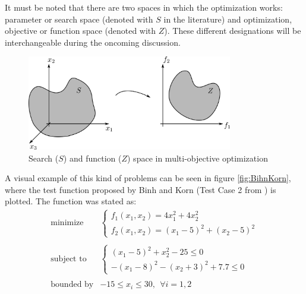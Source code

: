     \newpage
    
    It must be noted that there are two spaces in which the optimization works: parameter or search space (denoted with $S$ in the literature) and optimization, objective or function space (denoted with $Z$). These different designations will be interchangeable during the oncoming discussion. 
    
    \begin{figure}[h!]
        \centering
        \includegraphics[width=0.8\textwidth]{Figures/2/searchSpaceFunction.png}
        \caption{Search ($S$) and function ($Z$) space in multi-objective optimization}
        \label{fig:twoSpaces}
    \end{figure}    
    
    A visual example of this kind of problems can be seen in figure \ref{fig:BihnKorn}, where the test function proposed by Binh and Korn (Test Case 2 from \cite{binh1997mobes}) is plotted. The function was stated as:
    \begin{equation}
        \begin{array}{cl}
            \textrm{minimize} & 
            \left\{ \begin{array}{l}
                f_1(x_1,x_2) = 4x_1^2 + 4x_2^2\\
                f_2(x_1,x_2) = (x_1-5)^2+(x_2-5)^2
            \end{array} \right. \\
            & \\
            \textrm{subject to} &  
            \left\{ \begin{array}{l}
                (x_1-5)^2+x_2^2-25 \leq 0\\
                -(x_1-8)^2-(x_2+3)^2 + 7.7 \leq 0
            \end{array} \right. \\
            & \\
            \textrm{bounded by} & -15 \leq x_i \leq 30, \ \ \forall i = 1,2
        \end{array}
        \label{eq:BihnKorn}
    \end{equation}
    
